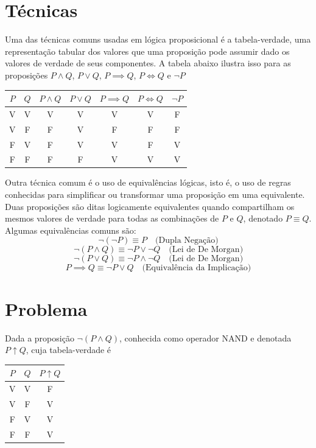 \documentclass{article}
\begin{document}
\section{Técnicas}

Uma das técnicas comuns usadas em lógica proposicional é a tabela-verdade, 
uma representação tabular dos valores que uma proposição pode assumir dado 
os valores de verdade de seus componentes. A tabela abaixo ilustra isso 
para as proposições $P \land Q$, $P \lor Q$, $P \implies Q$, $P \iff Q$ 
e $\neg P$

\begin{center}
\begin{tabular}{|c c|c|c|c|c|c|}
\hline
$P$ & $Q$ & $P \land Q$ & $P \lor Q$ & $P \implies Q$ & $P \iff Q$ & $\neg P$\\
\hline
V & V & V & V & V & V & F \\
V & F & F & V & F & F & F \\
F & V & F & V & V & F & V \\
F & F & F & F & V & V & V \\
\hline
\end{tabular}
\end{center}

Outra técnica comum é o uso de equivalências lógicas, isto é, o uso de 
regras conhecidas para simplificar ou transformar uma proposição em uma 
equivalente. Duas proposições são ditas logicamente equivalentes quando 
compartilham os mesmos valores de verdade para todas as combinações de 
$P$ e $Q$, denotado $P \equiv Q$. Algumas equivalências comuns são:
$$\neg(\neg P) \equiv P \quad \text{(Dupla Negação)}$$
$$\neg(P \land Q) \equiv \neg P \lor \neg Q \quad \text{(Lei de De Morgan)}$$
$$\neg(P \lor Q) \equiv \neg P \land \neg Q \quad \text{(Lei de De Morgan)}$$
$$P \implies Q \equiv \neg P \lor Q \quad \text{(Equivalência da Implicação)}$$
\newpage
\section{Problema}
Dada a proposição $\neg(P \land Q)$, conhecida como operador NAND e 
denotada $P \uparrow Q$, cuja tabela-verdade é

\begin{center}
\begin{tabular}{|c c|c|}
\hline
$P$ & $Q$ & $P \uparrow Q$\\
\hline
V & V & F \\
V & F & V \\
F & V & V \\
F & F & V \\
\hline
\end{tabular}
\end{center}
\end{document}
